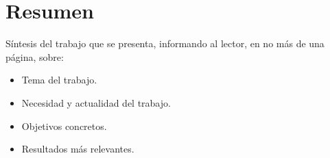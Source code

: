 \chapter*{\large Resumen}

Síntesis del trabajo que se presenta, informando al lector, en no más de una página, sobre:
\begin{itemize}
 \item Tema del trabajo.
 \item Necesidad y actualidad del trabajo.
 \item Objetivos concretos.
 \item Resultados más relevantes.
\end{itemize}



